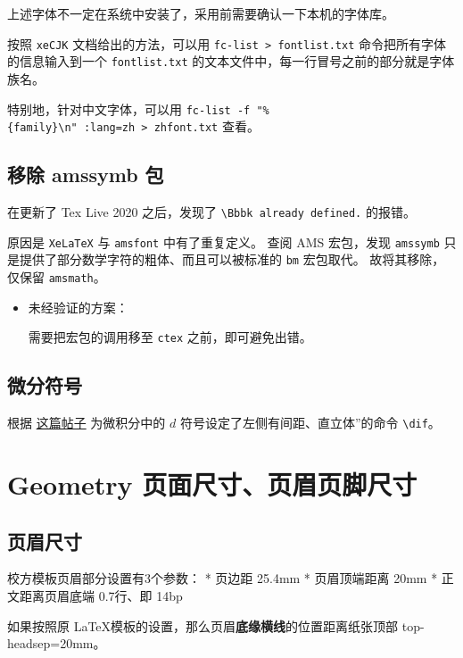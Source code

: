 \documentclass[../Main/thesis.tex]{subfiles}
\begin{document}
上述字体不一定在系统中安装了，采用前需要确认一下本机的字体库。

按照 \texttt{xeCJK} 文档给出的方法，可以用
\texttt{fc-list\ \textgreater{}\ fontlist.txt}
命令把所有字体的信息输入到一个 \texttt{fontlist.txt}
的文本文件中，每一行冒号之前的部分就是字体族名。

特别地，针对中文字体，可以用
\texttt{fc-list\ -f\ "\%\{family\}\textbackslash{}n"\ :lang=zh\ \textgreater{}\ zhfont.txt}
查看。

\subsection{移除 amssymb 包}

在更新了 Tex Live 2020 之后，发现了
\texttt{\textbackslash Bbbk already\ defined.}
的报错。

原因是 \texttt{XeLaTeX} 与 \texttt{amsfont} 中有了重复定义。 查阅 AMS
宏包，发现 \texttt{amssymb}
只是提供了部分数学字符的粗体、而且可以被标准的 \texttt{bm} 宏包取代。
故将其移除，仅保留 \texttt{amsmath}。

\begin{itemize}
\item
  未经验证的方案：

  需要把宏包的调用移至 \texttt{ctex} 之前，即可避免出错。
\end{itemize}

\subsection{微分符号}

根据
\href{https://liam.page/2017/05/01/the-correct-way-to-use-differential-operator/}{这篇帖子}
为微积分中的 \(d\) 符号设定了左侧有间距、直立体''的命令
\texttt{\textbackslash{}dif}。

\section{Geometry
页面尺寸、页眉页脚尺寸}

\subsection{页眉尺寸}

校方模板页眉部分设置有3个参数： * 页边距 25.4mm * 页眉顶端距离 20mm *
正文距离页眉底端 0.7行、即 14bp

如果按照原 \LaTeX 模板的设置，那么页眉\textbf{底缘横线}的位置距离纸张顶部
top-headsep=20mm。
\end{document}
